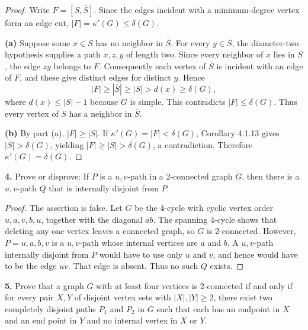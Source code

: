 \documentclass[12pt]{amsart}
\theoremstyle{conjecture}
\theoremstyle{definition}
\theoremstyle{question}
\theoremstyle{theorem}
\begin{document}
    \begin{proof}

        Write $F=[S,\overline S]$. Since the edges incident with a
        minimum-degree vertex form an edge cut, $|F|=\kappa'(G)\le\delta(G)$.

        \textbf{(a)} Suppose some $x\in S$ has no neighbor in
        $\overline S$. For every $y\in\overline S$, the diameter-two
        hypothesis supplies a path $x,z,y$ of length two. Since every
        neighbor of $x$ lies in $S$, the edge $zy$ belongs to $F$.
        Consequently each vertex of $\overline S$ is incident with an
        edge of $F$, and these give distinct edges for distinct $y$.
        Hence
        \[
        |F|\ge |\overline S|\ge |S|>d(x)\ge\delta(G),
        \]
        where $d(x)\le |S|-1$ because $G$ is simple. This contradicts
        $|F|\le\delta(G)$. Thus every vertex of $S$ has a neighbor in
        $\overline S$.

        \textbf{(b)} By part (a), $|F|\ge |S|$. If
        $\kappa'(G)=|F|<\delta(G)$, Corollary 4.1.13 gives
        $|S|>\delta(G)$, yielding
        $|F|\ge |S|>\delta(G)$, a contradiction. Therefore
        $\kappa'(G)=\delta(G)$.
    \end{proof}

    \noindent\textbf{4.} Prove or disprove: If $P$ is a $u,v$-path in a 2-connected graph $G$, then there
    is a $u,v$-path $Q$ that is internally disjoint from $P$.

    \begin{proof}

        The assertion is false. Let $G$ be the 4-cycle with cyclic
        vertex order $u,a,v,b,u$, together with the diagonal $ab$.
        The spanning 4-cycle shows that deleting any one vertex leaves
        a connected graph, so $G$ is 2-connected.
        However, $P=u,a,b,v$ is a $u,v$-path whose internal vertices
        are $a$ and $b$. A $u,v$-path internally disjoint from $P$
        would have to use only $u$ and $v$, and hence would have to be
        the edge $uv$. That edge is absent. Thus no such $Q$ exists.
    \end{proof}

    \noindent\textbf{5.} Prove that a graph $G$ with at least four vertices is 2-connected if and only if
    for every pair $X,Y$ of disjoint vertex sets with $|X|,|Y| \ge 2$, there exist two completely disjoint
    paths $P_1$ and $P_2$ in $G$ such that each has an endpoint in $X$ and an end point in $Y$ and
    no internal vertex in $X$ or $Y$.
\end{document}
